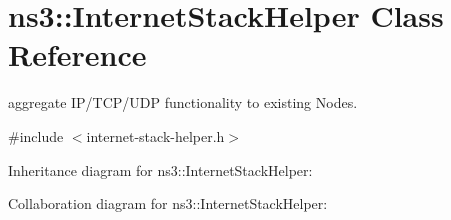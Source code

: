 \hypertarget{classns3_1_1InternetStackHelper}{}\section{ns3\+:\+:Internet\+Stack\+Helper Class Reference}
\label{classns3_1_1InternetStackHelper}


aggregate I\+P/\+T\+C\+P/\+U\+DP functionality to existing Nodes.  




{\ttfamily \#include $<$internet-\/stack-\/helper.\+h$>$}



Inheritance diagram for ns3\+:\+:Internet\+Stack\+Helper\+:


Collaboration diagram for ns3\+:\+:Internet\+Stack\+Helper\+:
